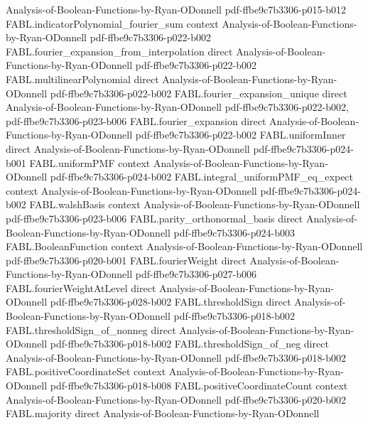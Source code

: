 \begin{theorem}
  {Analysis-of-Boolean-Functions-by-Ryan-ODonnell}
  {pdf-ffbe9c7b3306-p015-b012}
\proofstep
  {FABL.indicatorPolynomial_fourier_sum}
  {context}
  {Analysis-of-Boolean-Functions-by-Ryan-ODonnell}
  {pdf-ffbe9c7b3306-p022-b002}
\proofstep
  {FABL.fourier_expansion_from_interpolation}
  {direct}
  {Analysis-of-Boolean-Functions-by-Ryan-ODonnell}
  {pdf-ffbe9c7b3306-p022-b002}
\proofstep
  {FABL.multilinearPolynomial}
  {direct}
  {Analysis-of-Boolean-Functions-by-Ryan-ODonnell}
  {pdf-ffbe9c7b3306-p022-b002}
\proofstep
  {FABL.fourier_expansion_unique}
  {direct}
  {Analysis-of-Boolean-Functions-by-Ryan-ODonnell}
  {pdf-ffbe9c7b3306-p022-b002,
    pdf-ffbe9c7b3306-p023-b006}
\proofstep
  {FABL.fourier_expansion}
  {direct}
  {Analysis-of-Boolean-Functions-by-Ryan-ODonnell}
  {pdf-ffbe9c7b3306-p022-b002}
\proofstep
  {FABL.uniformInner}
  {direct}
  {Analysis-of-Boolean-Functions-by-Ryan-ODonnell}
  {pdf-ffbe9c7b3306-p024-b001}
\proofstep
  {FABL.uniformPMF}
  {context}
  {Analysis-of-Boolean-Functions-by-Ryan-ODonnell}
  {pdf-ffbe9c7b3306-p024-b002}
\proofstep
  {FABL.integral_uniformPMF_eq_expect}
  {context}
  {Analysis-of-Boolean-Functions-by-Ryan-ODonnell}
  {pdf-ffbe9c7b3306-p024-b002}
\proofstep
  {FABL.walshBasis}
  {context}
  {Analysis-of-Boolean-Functions-by-Ryan-ODonnell}
  {pdf-ffbe9c7b3306-p023-b006}
\proofstep
  {FABL.parity_orthonormal_basis}
  {direct}
  {Analysis-of-Boolean-Functions-by-Ryan-ODonnell}
  {pdf-ffbe9c7b3306-p024-b003}
\proofstep
  {FABL.BooleanFunction}
  {context}
  {Analysis-of-Boolean-Functions-by-Ryan-ODonnell}
  {pdf-ffbe9c7b3306-p020-b001}
\proofstep
  {FABL.fourierWeight}
  {direct}
  {Analysis-of-Boolean-Functions-by-Ryan-ODonnell}
  {pdf-ffbe9c7b3306-p027-b006}
\proofstep
  {FABL.fourierWeightAtLevel}
  {direct}
  {Analysis-of-Boolean-Functions-by-Ryan-ODonnell}
  {pdf-ffbe9c7b3306-p028-b002}
\proofstep
  {FABL.thresholdSign}
  {direct}
  {Analysis-of-Boolean-Functions-by-Ryan-ODonnell}
  {pdf-ffbe9c7b3306-p018-b002}
\proofstep
  {FABL.thresholdSign_of_nonneg}
  {direct}
  {Analysis-of-Boolean-Functions-by-Ryan-ODonnell}
  {pdf-ffbe9c7b3306-p018-b002}
\proofstep
  {FABL.thresholdSign_of_neg}
  {direct}
  {Analysis-of-Boolean-Functions-by-Ryan-ODonnell}
  {pdf-ffbe9c7b3306-p018-b002}
\proofstep
  {FABL.positiveCoordinateSet}
  {context}
  {Analysis-of-Boolean-Functions-by-Ryan-ODonnell}
  {pdf-ffbe9c7b3306-p018-b008}
\proofstep
  {FABL.positiveCoordinateCount}
  {context}
  {Analysis-of-Boolean-Functions-by-Ryan-ODonnell}
  {pdf-ffbe9c7b3306-p020-b002}
\proofstep
  {FABL.majority}
  {direct}
  {Analysis-of-Boolean-Functions-by-Ryan-ODonnell}

\end{theorem}
